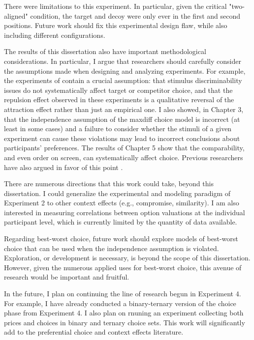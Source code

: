 There were limitations to this experiment. In particular, given the critical "two-aligned" condition, the target and decoy were only ever in the first and second positions. Future work should fix this experimental design flaw, while also including different configurations.

The results of this dissertation also have important methodological considerations. In particular, I argue that researchers should carefully consider the assumptions made when designing and analyzing experiments. For example, the experiments of \textcite{spektorWhenGoodLooks2018b} contain a crucial assumption: that stimulus discriminability issues do not systematically affect target or competitor choice, and that the repulsion effect observed in these experiments is a qualitative reversal of the attraction effect rather than just an empirical one. I also showed, in Chapter 3, that the independence assumption of the maxdiff choice model is incorrect (at least in some cases) and a failure to consider whether the stimuli of a given experiment can cause these violations may lead to incorrect conclusions about participants' preferences. The results of Chapter 5 show that the comparability, and even order on screen, can systematically affect choice. Previous researchers have also argued in favor of this point \parencite{trueblood2022attentional,hasan2025registered,evansImpactPresentationOrder2021}. 

There are numerous directions that this work could take, beyond this dissertation. I could generalize the experimental and modeling paradigm of Experiment 2 to other context effects (e.g., compromise, similarity). I am also interested in measuring correlations between option valuations at the individual participant level, which is currently limited by the quantity of data available. 

Regarding best-worst choice, future work should explore models of best-worst choice that can be used when the independence assumption is violated. Exploration, or development is necessary, is beyond the scope of this dissertation. However, given the numerous applied uses for best-worst choice, this avenue of research would be important and fruitful.

In the future, I plan on continuing the line of research begun in Experiment 4. For example, I have already conducted a binary-ternary version of the choice phase from Experiment 4. I also plan on rnuning an experiment collecting both prices and choices in binary and ternary choice sets. This work will significantly add to the preferential choice and context effects literature.

